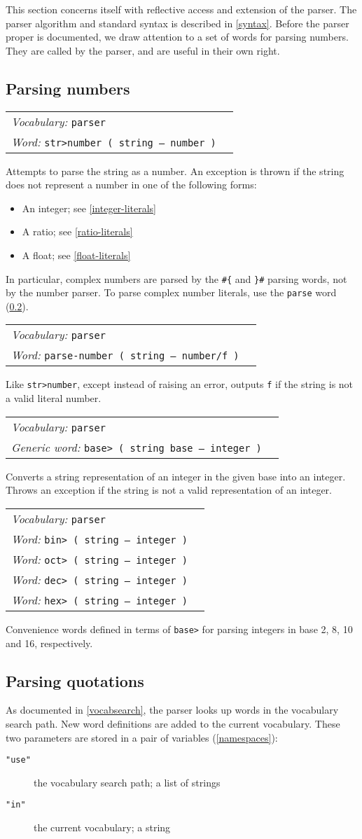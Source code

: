\documentclass{book}
\newcommand{\vocabulary}[1]{\emph{Vocabulary:} \texttt{#1}&\\}
\newcommand{\ordinaryword}[2]{\index{\texttt{#1}}\emph{Word:} \texttt{#2}&\\}
\newcommand{\genericword}[2]{\index{\texttt{#1}}\emph{Generic word:} \texttt{#2}&\\}
\newcommand{\wordtable}[1]{


\begin{tabularx}{12cm}{lX}
\hline
#1
\hline
\end{tabularx}

}
\begin{document}
This section concerns itself with reflective access and extension of the parser. The parser algorithm and standard syntax is described in \ref{syntax}. Before the parser proper is documented, we draw attention to a set of words for parsing numbers. They are called by the parser, and are useful in their own right.

\subsection{Parsing numbers}\label{parsing-numbers}

\wordtable{
\vocabulary{parser}
\ordinaryword{str>number}{str>number~( string -- number )}
}
Attempts to parse the string as a number. An exception is thrown if the string does not represent a number in one of the following forms:
\begin{itemize}
\item An integer; see \ref{integer-literals}
\item A ratio; see \ref{ratio-literals}
\item A float; see \ref{float-literals}
\end{itemize}
In particular, complex numbers are parsed by the \verb|#{| and \verb|}#| parsing words, not by the number parser. To parse complex number literals, use the \texttt{parse} word (\ref{parsing-quotations}).
\wordtable{
\vocabulary{parser}
\ordinaryword{parse-number}{parse-number~( string -- number/f )}
}
Like \texttt{str>number}, except instead of raising an error, outputs \texttt{f} if the string is not a valid literal number.
\wordtable{
\vocabulary{parser}
\genericword{base>}{base>~( string base -- integer )}
}
Converts a string representation of an integer in the given base into an integer. Throws an exception if the string is not a valid representation of an integer.
\wordtable{
\vocabulary{parser}
\ordinaryword{bin>}{bin>~( string -- integer )}
\ordinaryword{oct>}{oct>~( string -- integer )}
\ordinaryword{dec>}{dec>~( string -- integer )}
\ordinaryword{hex>}{hex>~( string -- integer )}
}
Convenience words defined in terms of \texttt{base>} for parsing integers in base 2, 8, 10 and 16, respectively.

\subsection{Parsing quotations}\label{parsing-quotations}

As documented in \ref{vocabsearch}, the parser looks up words in the vocabulary search path. New word definitions are added to the current vocabulary. These two parameters are stored in a pair of variables (\ref{namespaces}):
\begin{description}
\item[\texttt{"use"}] the vocabulary search path; a list of strings
\item[\texttt{"in"}] the current vocabulary; a string
\end{description}
\end{document}
